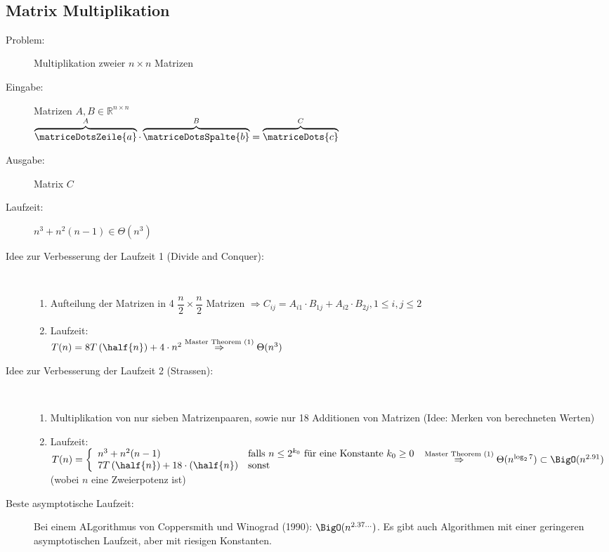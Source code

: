 \\
\subsection{Matrix Multiplikation}
\begin{description}
	\item[Problem:] Multiplikation zweier $n\times n $ Matrizen
	\item[Eingabe:] Matrizen $A,B \in \mathbb{R}^{n\times n}$\\
		$\overbrace{\matriceDotsZeile{a}}^{A} \cdot \overbrace{\matriceDotsSpalte{b}}^{B} = \overbrace{\matriceDots{c}}^{C}$
	\item[Ausgabe:] Matrix $C$
	\item[Laufzeit:] $n^3+n^2(n-1) \in \Theta(n^3)$
	\item[Idee zur Verbesserung der Laufzeit 1 (Divide and Conquer):]\ \\\vspace*{-\baselineskip}
		\begin{enumerate}
			\item Aufteilung der Matrizen in 4 $\dfrac{n}{2}\times \dfrac{n}{2}$ Matrizen $\Rightarrow C_{ij} = A_{i1} \cdot B_{1j} + A_{i2} \cdot B_{2j}, 1\leq i,j\leq 2$
			\item Laufzeit:\\
			$T(n)= 8T\left(\half{n}\right)+4\cdot n^2\\
			\overset{\text{Master Theorem (1)}}{\Rightarrow} \Theta(n^3)$
		\end{enumerate}
\end{description}
\topbreak
\vspace*{-1\baselineskip}
\begin{description}
	\item[Idee zur Verbesserung der Laufzeit 2 (Strassen):]\ \\\vspace*{-\baselineskip}
		\begin{enumerate}
			\item Multiplikation von nur sieben Matrizenpaaren, sowie nur 18 Additionen von Matrizen (Idee: Merken von berechneten Werten)
			\item Laufzeit:\\$T(n)=
				\left\lbrace
					\begin{array}{ll}
						n^3 + n^2(n-1) & \text{falls } n\leq 2^{k_0} \text{ für eine Konstante } k_0 \geq 0\\
						7T\left(\half{n}\right)+18\cdot \left(\half{n}\right) & \text{sonst}
					\end{array}
				\right. 
				\\
				\overset{\text{Master Theorem (1)}}{\Rightarrow} \Theta(n^{\log_2 7})\subset\BigO(n^{2.91})$ (wobei $n$ eine Zweierpotenz ist)
		\end{enumerate}
	\item[Beste asymptotische Laufzeit:] Bei einem ALgorithmus von Coppersmith und Winograd (1990): $\BigO(n^{2.37\dots})$. Es gibt auch Algorithmen mit einer geringeren asymptotischen Laufzeit, aber mit riesigen Konstanten.
\end{description}

